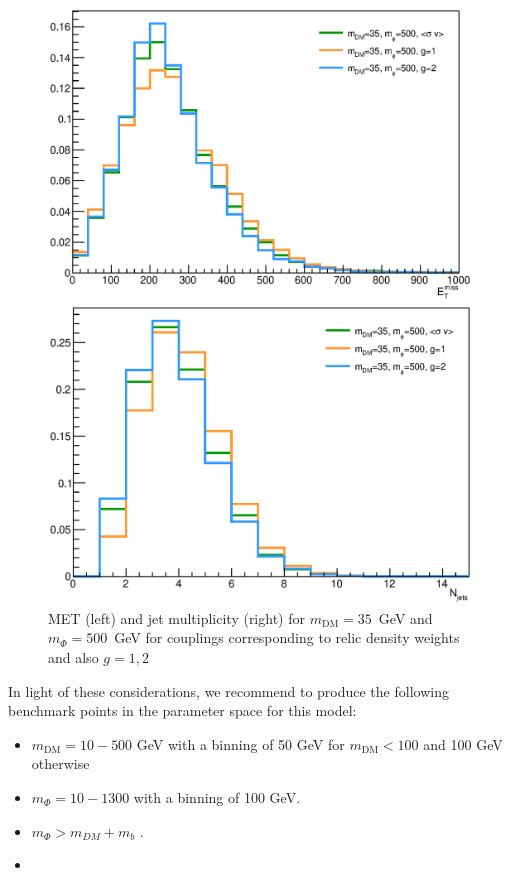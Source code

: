 \begin{figure}[h!]
    \begin{minipage}{0.49\textwidth}
      \centering 
      \includegraphics[scale=0.32]{figures/bFDM/bfdm_35_500/missing_et.eps}
    \end{minipage}
    \hfill
    \begin{minipage}{0.49\textwidth}
      \centering 
      \includegraphics[scale=0.32]{figures/bFDM/bfdm_35_500/Njets.eps}
    \end{minipage}
    \caption{MET (left) and jet multiplicity (right) for $m_\textrm{DM}=35$~GeV and $m_\Phi=500$~GeV for couplings corresponding to relic density weights and also $g=1,2$ \label{fig:g_comp}}
\end{figure}

In light of these considerations, we recommend to produce the following benchmark points in the parameter space for this model:
\begin{itemize}
  \item $m_\textrm{DM}=10-500$ GeV with a binning of 50 GeV for $m_\textrm{DM}<100$ and  100 GeV otherwise  
  \item $m_\Phi=10-1300$ with a binning of 100 GeV.
  \item $m_\Phi > m_{DM} + m_b$ .
  \item {}
\end{itemize}


